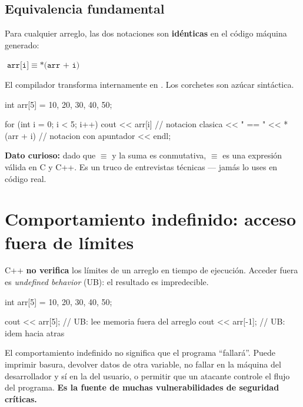 \documentclass[12pt, oneside]{article}
\begin{document}
\subsection{Equivalencia fundamental}

Para cualquier arreglo, las dos notaciones son \textbf{idénticas} en el
código máquina generado:

\begin{center}
  \Large $\texttt{arr[i]} \;\equiv\; \texttt{*(arr + i)}$
\end{center}

El compilador transforma internamente  en .
Los corchetes son azúcar sintáctica.

\begin{codigo}[caption={Dos formas equivalentes de recorrer un arreglo}]
int arr[5] = {10, 20, 30, 40, 50};

for (int i = 0; i < 5; i++) {
    cout << arr[i]       // notacion clasica
         << " == "
         << *(arr + i)   // notacion con apuntador
         << endl;
}
\end{codigo}

\begin{tecnico}
  \textbf{Dato curioso:} dado que  $\equiv$  y
  la suma es conmutativa,  $\equiv$  es una expresión
  válida en C y C++. Es un truco de entrevistas técnicas — jamás lo uses en
  código real.
\end{tecnico}

\section{Comportamiento indefinido: acceso fuera de límites}

C++ \textbf{no verifica} los límites de un arreglo en tiempo de ejecución.
Acceder fuera es \textit{undefined behavior} (UB): el resultado es impredecible.

\begin{codigo}
int arr[5] = {10, 20, 30, 40, 50};

cout << arr[5];   // UB: lee memoria fuera del arreglo
cout << arr[-1];  // UB: idem hacia atras
\end{codigo}

\begin{advertencia}
  El comportamiento indefinido no significa que el programa ``fallará''. Puede
  imprimir basura, devolver datos de otra variable, no fallar en la máquina
  del desarrollador y sí en la del usuario, o permitir que un atacante
  controle el flujo del programa. \textbf{Es la fuente de muchas
  vulnerabilidades de seguridad críticas.}
\end{advertencia}
\end{document}
